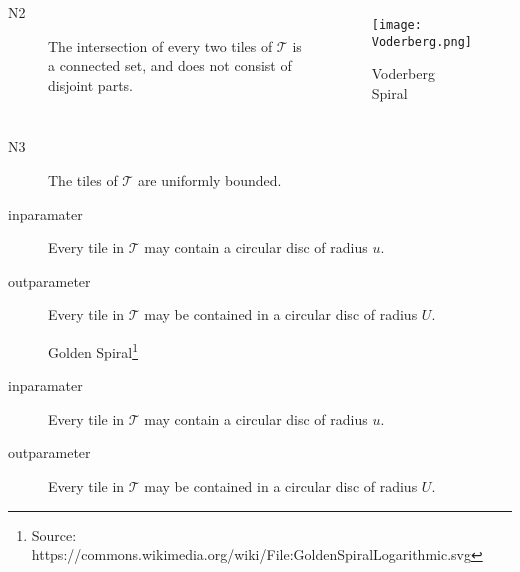\documentclass{beamer}
\begin{document}
\begin{frame} 
    \begin{columns}
    \begin{description} 
        \item[N2] The intersection of every two tiles of $\mathscr{T}$ is a connected set, and does not consist of disjoint parts.
    \end{description} 
    \begin{figure}
        \center
        \texttt{[image: Voderberg.png]} 
        \caption{Voderberg Spiral\footnotemark} 
    \end{figure}
    \end{columns}
\end{frame} 

\begin{frame} 
    \begin{description} 
        \item[N3] The tiles of $\mathscr{T}$ are uniformly bounded.
        \item[inparamater] Every tile in $\mathscr{T}$ may contain a circular disc of radius $u$.
        \item[outparameter] Every tile in $\mathscr{T}$ may be contained in a circular disc of radius $U$.
    \end{description} 
    \begin{figure} 
        \center 
        
        \caption{Golden Spiral\footnote{Source: https://commons.wikimedia.org/wiki/File:GoldenSpiralLogarithmic.svg}}
    \end{figure} 
\end{frame} 

\begin{frame} 
    \begin{description}
         \item[inparamater] Every tile in $\mathscr{T}$ may contain a circular disc of radius $u$.
        \item[outparameter] Every tile in $\mathscr{T}$ may be contained in a circular disc of radius $U$.
    \end{description} 
    \begin{figure} 
        \center 
         
    \end{figure} 
\end{frame}
\end{document}

